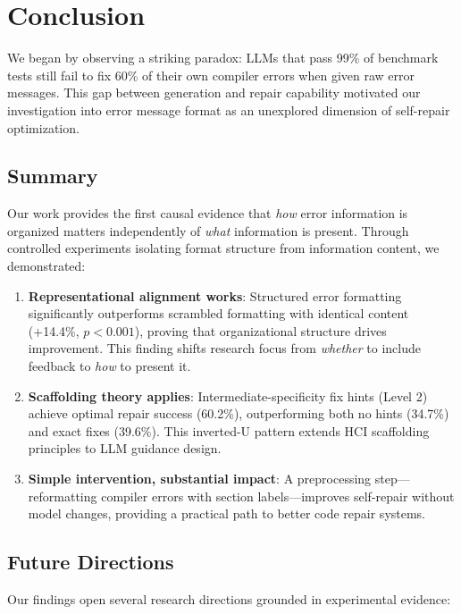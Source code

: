 \section{Conclusion}

We began by observing a striking paradox: LLMs that pass 99\% of benchmark tests still fail to fix 60\% of their own compiler errors when given raw error messages. This gap between generation and repair capability motivated our investigation into error message format as an unexplored dimension of self-repair optimization.

\subsection{Summary}

Our work provides the first causal evidence that \emph{how} error information is organized matters independently of \emph{what} information is present. Through controlled experiments isolating format structure from information content, we demonstrated:

\begin{enumerate}
    \item \textbf{Representational alignment works}: Structured error formatting significantly outperforms scrambled formatting with identical content (+14.4\%, $p < 0.001$), proving that organizational structure drives improvement. This finding shifts research focus from \emph{whether} to include feedback to \emph{how} to present it.

    \item \textbf{Scaffolding theory applies}: Intermediate-specificity fix hints (Level 2) achieve optimal repair success (60.2\%), outperforming both no hints (34.7\%) and exact fixes (39.6\%). This inverted-U pattern extends HCI scaffolding principles to LLM guidance design.

    \item \textbf{Simple intervention, substantial impact}: A preprocessing step---reformatting compiler errors with section labels---improves self-repair without model changes, providing a practical path to better code repair systems.
\end{enumerate}

\subsection{Future Directions}

Our findings open several research directions grounded in experimental evidence:

